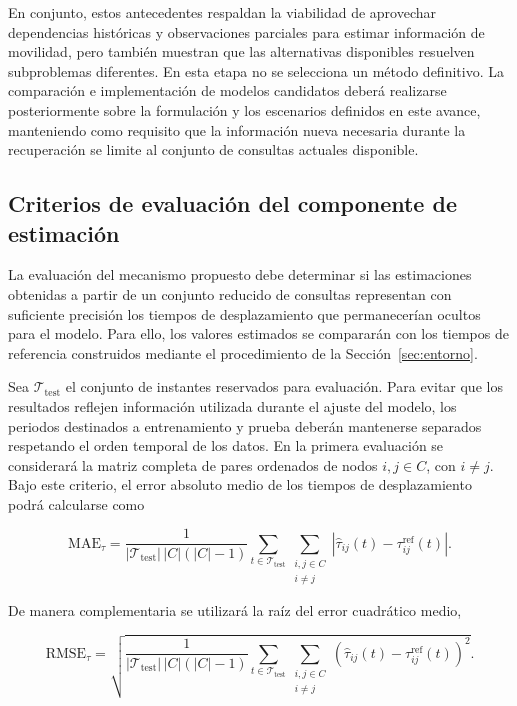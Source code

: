 \documentclass[11pt]{article}
\begin{document}
En conjunto, estos antecedentes respaldan la viabilidad de aprovechar
dependencias históricas y observaciones parciales para estimar información de
movilidad, pero también muestran que las alternativas disponibles resuelven
subproblemas diferentes. En esta etapa no se selecciona un método definitivo.
La comparación e implementación de modelos candidatos deberá realizarse
posteriormente sobre la formulación y los escenarios definidos en este
avance, manteniendo como requisito que la información nueva necesaria durante
la recuperación se limite al conjunto de consultas actuales disponible.


\subsection{Criterios de evaluación del componente de estimación}

La evaluación del mecanismo propuesto debe determinar si las estimaciones
obtenidas a partir de un conjunto reducido de consultas representan con
suficiente precisión los tiempos de desplazamiento que permanecerían ocultos
para el modelo. Para ello, los valores estimados se compararán con los tiempos
de referencia construidos mediante el procedimiento de la Sección~\ref{sec:entorno}.

Sea \(\mathcal{T}_{\mathrm{test}}\) el conjunto de instantes reservados para
evaluación. Para evitar que los resultados reflejen información utilizada
durante el ajuste del modelo, los periodos destinados a entrenamiento y prueba
deberán mantenerse separados respetando el orden temporal de los datos. En la
primera evaluación se considerará la matriz completa de pares ordenados de
nodos \(i,j\in C\), con \(i\neq j\). Bajo este criterio, el error absoluto
medio de los tiempos de desplazamiento podrá calcularse como

\[
\mathrm{MAE}_{\tau}
=
\frac{1}
{|\mathcal{T}_{\mathrm{test}}|\,|C|(|C|-1)}
\sum_{t\in\mathcal{T}_{\mathrm{test}}}
\sum_{\substack{i,j\in C\\ i\neq j}}
\left|
\widehat{\tau}_{ij}(t)
-
\tau_{ij}^{\mathrm{ref}}(t)
\right|.
\]

De manera complementaria se utilizará la raíz del error cuadrático medio,

\[
\mathrm{RMSE}_{\tau}
=
\sqrt{
\frac{1}
{|\mathcal{T}_{\mathrm{test}}|\,|C|(|C|-1)}
\sum_{t\in\mathcal{T}_{\mathrm{test}}}
\sum_{\substack{i,j\in C\\ i\neq j}}
\left(
\widehat{\tau}_{ij}(t)
-
\tau_{ij}^{\mathrm{ref}}(t)
\right)^2
}.
\]
\end{document}
